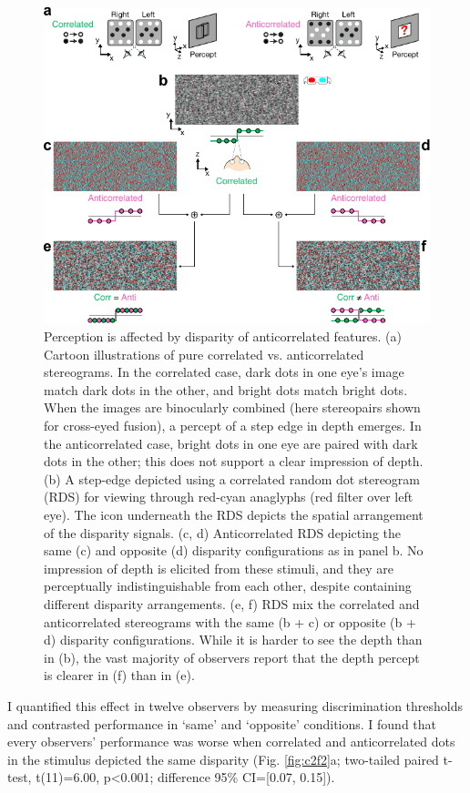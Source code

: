 \begin{figure}
  \centering
  \includegraphics{Fig1}
  \caption[Perception is affected by disparity of anticorrelated features.]{Perception is affected by disparity of anticorrelated features. (a) Cartoon illustrations of pure correlated vs. anticorrelated stereograms. In the correlated case, dark dots in one eye's image match dark dots in the other, and bright dots match bright dots. When the images are binocularly combined (here stereopairs shown for cross-eyed fusion), a percept of a step edge in depth emerges. In the anticorrelated case, bright dots in one eye are paired with dark dots in the other; this does not support a clear impression of depth. (b) A step-edge depicted using a correlated random dot stereogram (RDS) for viewing through red-cyan anaglyphs (red filter over left eye). The icon underneath the RDS depicts the spatial arrangement of the disparity signals. (c, d) Anticorrelated RDS depicting the same (c) and opposite (d) disparity configurations as in panel b. No impression of depth is elicited from these stimuli, and they are perceptually indistinguishable from each other, despite containing different disparity arrangements. (e, f) RDS mix the correlated and anticorrelated stereograms with the same (b + c) or opposite (b + d) disparity configurations. While it is harder to see the depth than in (b), the vast majority of observers report that the depth percept is clearer in (f) than in (e).}
  \label{fig:c2f1}
\end{figure}


I quantified this effect in twelve observers by measuring discrimination thresholds and contrasted performance in `same' and `opposite' conditions. I found that every observers' performance was worse when correlated and anticorrelated dots in the stimulus depicted the same disparity (Fig. \ref{fig:c2f2}a; two-tailed paired t-test, t(11)=6.00, p<0.001; difference 95\% CI=[0.07, 0.15]). 

